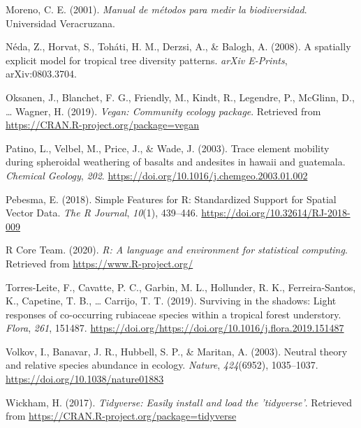 \documentclass[11pt,]{article}
\begin{document}
\hypertarget{ref-moreno2001manual}{}
Moreno, C. E. (2001). \emph{Manual de métodos para medir la
biodiversidad}. Universidad Veracruzana.

\hypertarget{ref-2008arXiv0803.3704N}{}
Néda, Z., Horvat, S., Toháti, H. M., Derzsi, A., \& Balogh, A. (2008). A
spatially explicit model for tropical tree diversity patterns.
\emph{arXiv E-Prints}, arXiv:0803.3704.

\hypertarget{ref-cita_vegan}{}
Oksanen, J., Blanchet, F. G., Friendly, M., Kindt, R., Legendre, P.,
McGlinn, D., \ldots{} Wagner, H. (2019). \emph{Vegan: Community ecology
package}. Retrieved from \url{https://CRAN.R-project.org/package=vegan}

\hypertarget{ref-patino_weathering}{}
Patino, L., Velbel, M., Price, J., \& Wade, J. (2003). Trace element
mobility during spheroidal weathering of basalts and andesites in hawaii
and guatemala. \emph{Chemical Geology}, \emph{202}.
\url{https://doi.org/10.1016/j.chemgeo.2003.01.002}

\hypertarget{ref-cita_sf}{}
Pebesma, E. (2018). Simple Features for R: Standardized Support for
Spatial Vector Data. \emph{The R Journal}, \emph{10}(1), 439--446.
\url{https://doi.org/10.32614/RJ-2018-009}

\hypertarget{ref-cita_r}{}
R Core Team. (2020). \emph{R: A language and environment for statistical
computing}. Retrieved from \url{https://www.R-project.org/}

\hypertarget{ref-TORRESLEITE2019151487}{}
Torres-Leite, F., Cavatte, P. C., Garbin, M. L., Hollunder, R. K.,
Ferreira-Santos, K., Capetine, T. B., \ldots{} Carrijo, T. T. (2019).
Surviving in the shadows: Light responses of co-occurring rubiaceae
species within a tropical forest understory. \emph{Flora}, \emph{261},
151487.
\url{https://doi.org/https://doi.org/10.1016/j.flora.2019.151487}

\hypertarget{ref-Volkov_2003}{}
Volkov, I., Banavar, J. R., Hubbell, S. P., \& Maritan, A. (2003).
Neutral theory and relative species abundance in ecology. \emph{Nature},
\emph{424}(6952), 1035--1037. \url{https://doi.org/10.1038/nature01883}

\hypertarget{ref-cita_tidyverse}{}
Wickham, H. (2017). \emph{Tidyverse: Easily install and load the
'tidyverse'}. Retrieved from
\url{https://CRAN.R-project.org/package=tidyverse}




\newpage
\singlespacing 
\end{document}
